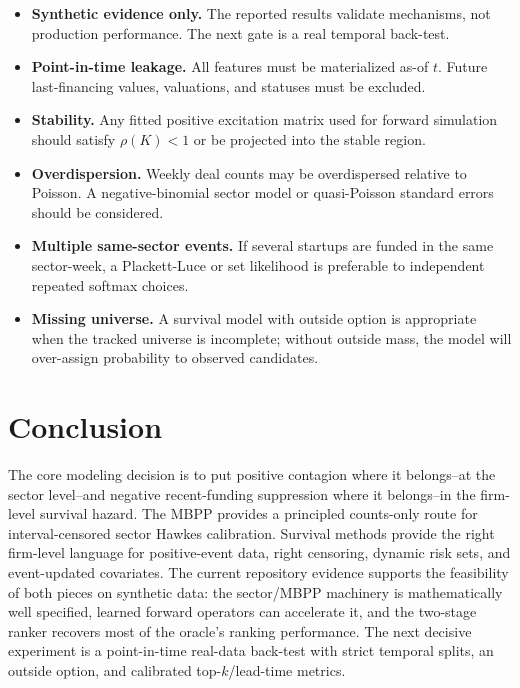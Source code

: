 \documentclass[11pt]{article}
\theoremstyle{plain}
\theoremstyle{definition}
\theoremstyle{remark}
\begin{document}
\begin{itemize}[leftmargin=1.5em]
\item \textbf{Synthetic evidence only.} The reported results validate mechanisms, not production performance. The next gate is a real temporal back-test.
\item \textbf{Point-in-time leakage.} All features must be materialized as-of $t$. Future last-financing values, valuations, and statuses must be excluded.
\item \textbf{Stability.} Any fitted positive excitation matrix used for forward simulation should satisfy $\rho(K)<1$ or be projected into the stable region.
\item \textbf{Overdispersion.} Weekly deal counts may be overdispersed relative to Poisson. A negative-binomial sector model or quasi-Poisson standard errors should be considered.
\item \textbf{Multiple same-sector events.} If several startups are funded in the same sector-week, a Plackett-Luce or set likelihood is preferable to independent repeated softmax choices.
\item \textbf{Missing universe.} A survival model with outside option is appropriate when the tracked universe is incomplete; without outside mass, the model will over-assign probability to observed candidates.
\end{itemize}



\section{Conclusion}
\label{sec:conclusion}

The core modeling decision is to put positive contagion where it belongs--at the sector level--and negative recent-funding suppression where it belongs--in the firm-level survival hazard. The MBPP provides a principled counts-only route for interval-censored sector Hawkes calibration. Survival methods provide the right firm-level language for positive-event data, right censoring, dynamic risk sets, and event-updated covariates. The current repository evidence supports the feasibility of both pieces on synthetic data: the sector/MBPP machinery is mathematically well specified, learned forward operators can accelerate it, and the two-stage ranker recovers most of the oracle's ranking performance. The next decisive experiment is a point-in-time real-data back-test with strict temporal splits, an outside option, and calibrated top-$k$/lead-time metrics.
\end{document}
